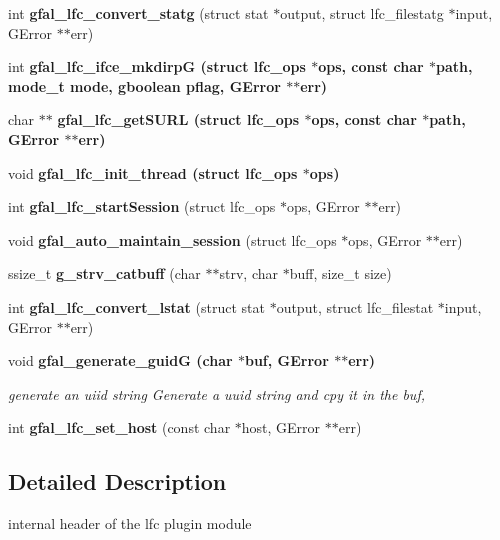 \begin{CompactItemize}
\item 
int \textbf{gfal\_\-lfc\_\-convert\_\-statg} (struct stat $\ast$output, struct lfc\_\-filestatg $\ast$input, GError $\ast$$\ast$err)\label{lfc__ifce__ng_8h_79cceda78f871c9bd8568a636dd31206}

\item 
int \bf{gfal\_\-lfc\_\-ifce\_\-mkdirp\-G} (struct lfc\_\-ops $\ast$ops, const char $\ast$path, mode\_\-t mode, gboolean pflag, GError $\ast$$\ast$err)
\item 
char $\ast$$\ast$ \bf{gfal\_\-lfc\_\-get\-SURL} (struct lfc\_\-ops $\ast$ops, const char $\ast$path, GError $\ast$$\ast$err)
\item 
void \bf{gfal\_\-lfc\_\-init\_\-thread} (struct lfc\_\-ops $\ast$ops)
\item 
int \textbf{gfal\_\-lfc\_\-start\-Session} (struct lfc\_\-ops $\ast$ops, GError $\ast$$\ast$err)\label{lfc__ifce__ng_8h_191824f5c6bfee67e81f0c495e9bb778}

\item 
void \textbf{gfal\_\-auto\_\-maintain\_\-session} (struct lfc\_\-ops $\ast$ops, GError $\ast$$\ast$err)\label{lfc__ifce__ng_8h_9be7f93578b4772ec1498fe197f3c2c4}

\item 
ssize\_\-t \textbf{g\_\-strv\_\-catbuff} (char $\ast$$\ast$strv, char $\ast$buff, size\_\-t size)\label{lfc__ifce__ng_8h_bc04cd8d7342170700f02f6297fc4105}

\item 
int \textbf{gfal\_\-lfc\_\-convert\_\-lstat} (struct stat $\ast$output, struct lfc\_\-filestat $\ast$input, GError $\ast$$\ast$err)\label{lfc__ifce__ng_8h_16e8d4c4177c6e1d39c1850f06042f97}

\item 
void \bf{gfal\_\-generate\_\-guid\-G} (char $\ast$buf, GError $\ast$$\ast$err)
\begin{CompactList}\small\item\em generate an uiid string Generate a uuid string and cpy it in the buf, \item\end{CompactList}\item 
int \textbf{gfal\_\-lfc\_\-set\_\-host} (const char $\ast$host, GError $\ast$$\ast$err)\label{lfc__ifce__ng_8h_8d1fdb84029a45d15dcd460c648f0fbc}

\end{CompactItemize}


\subsection{Detailed Description}
internal header of the lfc plugin module 

